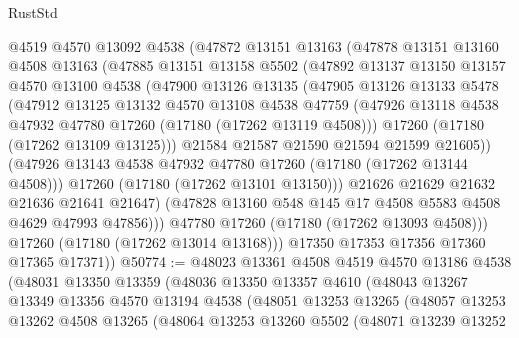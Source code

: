 \begin{lexlean}{RustStd}
\begin{coremodule}
            @4519
            @4570
            @13092
            @4538
            (@47872
              @13151
              @13163
              (@47878
                @13151
                @13160
                @4508
                @13163
                (@47885
                  @13151
                  @13158
                  @5502
                  (@47892
                    @13137
                    @13150
                    @13157
                    @4570
                    @13100
                    @4538
                    (@47900
                      @13126
                      @13135
                      (@47905
                        @13126
                        @13133
                        @5478
                        (@47912
                          @13125
                          @13132
                          @4570
                          @13108
                          @4538
                          @47759
                          (@47926 @13118 @4538 @47932 @47780 @17260 (@17180 (@17262 @13119 @4508)))
                          @17260
                          (@17180 (@17262 @13109 @13125)))
                        @21584
                        @21587
                        @21590
                        @21594
                        @21599
                        @21605))
                    (@47926 @13143 @4538 @47932 @47780 @17260 (@17180 (@17262 @13144 @4508)))
                    @17260
                    (@17180 (@17262 @13101 @13150)))
                  @21626
                  @21629
                  @21632
                  @21636
                  @21641
                  @21647)
                (@47828 @13160 @548 @145 @17 @4508 @5583 @4508 @4629 @47993 @47856)))
            @47780
            @17260
            (@17180 (@17262 @13093 @4508)))
          @17260
          (@17180 (@17262 @13014 @13168)))
        @17350
        @17353
        @17356
        @17360
        @17365
        @17371))
@50774 := @48023
    @13361
    @4508
    @4519
    @4570
    @13186
    @4538
    (@48031
      @13350
      @13359
      (@48036
        @13350
        @13357
        @4610
        (@48043
          @13267
          @13349
          @13356
          @4570
          @13194
          @4538
          (@48051
            @13253
            @13265
            (@48057
              @13253
              @13262
              @4508
              @13265
              (@48064
                @13253
                @13260
                @5502
                (@48071
                  @13239
                  @13252

\end{coremodule}
\end{lexlean}
